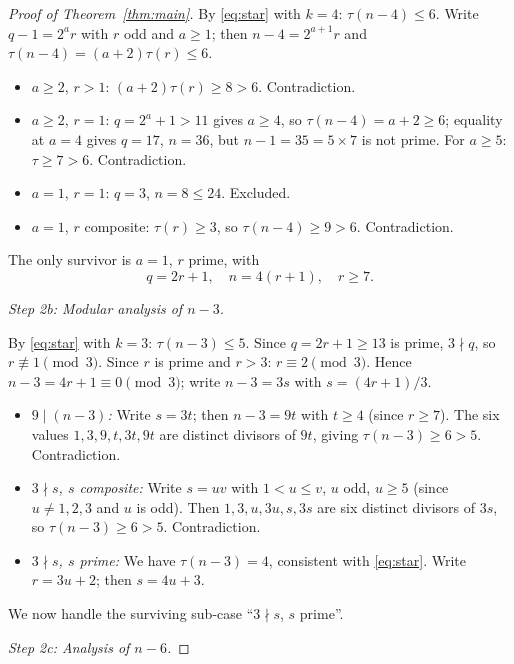 \documentclass[11pt]{article}
\begin{document}
\begin{proof}[Proof of Theorem~\ref{thm:main}]
By \eqref{eq:star} with $k = 4$: $\tau(n-4) \le 6$.
Write $q - 1 = 2^a r$ with $r$ odd and $a \ge 1$; then $n - 4 = 2^{a+1}r$ and
$\tau(n-4) = (a+2)\tau(r) \le 6$.

\begin{itemize}
\item $a \ge 2$, $r > 1$: $(a+2)\tau(r) \ge 8 > 6$. Contradiction.
\item $a \ge 2$, $r = 1$: $q = 2^a + 1 > 11$ gives $a \ge 4$, so $\tau(n-4)
  = a+2 \ge 6$; equality at $a = 4$ gives $q = 17$, $n = 36$, but $n - 1 = 35
  = 5 \times 7$ is not prime. For $a \ge 5$: $\tau \ge 7 > 6$. Contradiction.
\item $a = 1$, $r = 1$: $q = 3$, $n = 8 \le 24$. Excluded.
\item $a = 1$, $r$ composite: $\tau(r) \ge 3$, so $\tau(n-4) \ge 9 > 6$.
  Contradiction.
\end{itemize}

\noindent The only survivor is $a = 1$, $r$ prime, with
\[
  q = 2r + 1,\quad n = 4(r + 1), \quad r \ge 7.
\]

\medskip
\noindent\textit{Step 2b: Modular analysis of $n - 3$.}

By \eqref{eq:star} with $k = 3$: $\tau(n-3) \le 5$.
Since $q = 2r + 1 \ge 13$ is prime, $3 \nmid q$, so $r \not\equiv 1 \pmod 3$.
Since $r$ is prime and $r > 3$: $r \equiv 2 \pmod 3$.
Hence $n - 3 = 4r + 1 \equiv 0 \pmod 3$; write $n - 3 = 3s$ with $s = (4r+1)/3$.

\begin{itemize}
\item \emph{$9 \mid (n-3)$:} Write $s = 3t$; then $n - 3 = 9t$ with $t \ge 4$
  (since $r \ge 7$). The six values $1, 3, 9, t, 3t, 9t$ are distinct divisors
  of $9t$, giving $\tau(n-3) \ge 6 > 5$. Contradiction.

\item \emph{$3 \nmid s$, $s$ composite:} Write $s = uv$ with $1 < u \le v$,
  $u$ odd, $u \ge 5$ (since $u \ne 1, 2, 3$ and $u$ is odd).
  Then $1, 3, u, 3u, s, 3s$ are six distinct divisors of $3s$, so
  $\tau(n-3) \ge 6 > 5$. Contradiction.

\item \emph{$3 \nmid s$, $s$ prime:} We have $\tau(n-3) = 4$, consistent with
  \eqref{eq:star}. Write $r = 3u + 2$; then $s = 4u + 3$.
\end{itemize}

\noindent We now handle the surviving sub-case ``$3 \nmid s$, $s$ prime''.

\medskip
\noindent\textit{Step 2c: Analysis of $n - 6$.}


\end{proof}
\end{document}
